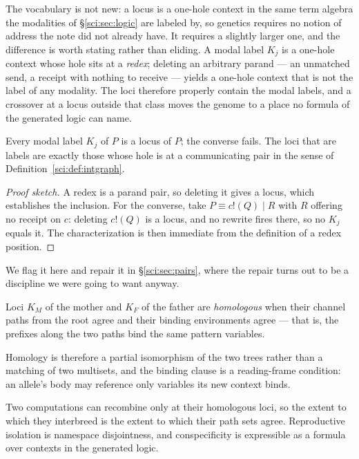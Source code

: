 The vocabulary is not new: a locus is a one-hole context in the same term algebra the modalities of
\S\ref{sci:sec:logic} are labeled by, so genetics requires no notion of address the note did not
already have. It requires a slightly larger one, and the difference is worth stating rather than
eliding. A modal label $K_j$ is a one-hole context whose hole sits at a \emph{redex}; deleting an
arbitrary parand --- an unmatched send, a receipt with nothing to receive --- yields a one-hole
context that is not the label of any modality. The loci therefore properly contain the modal
labels, and a crossover at a locus outside that class moves the genome to a place no formula of the
generated logic can name.

\begin{proposition}
\label{sci:prop:locivlabels}
Every modal label $K_j$ of $P$ is a locus of $P$; the converse fails. The loci that are labels are
exactly those whose hole is at a communicating pair in the sense of
Definition~\ref{sci:def:intgraph}.
\end{proposition}
\begin{proof}[Proof sketch]
A redex is a parand pair, so deleting it gives a locus, which establishes the inclusion. For the
converse, take $P \equiv c!(Q) \mid R$ with $R$ offering no receipt on $c$: deleting $c!(Q)$ is a
locus, and no rewrite fires there, so no $K_j$ equals it. The characterization is then immediate
from the definition of a redex position.
\end{proof}

We flag it here and repair it in \S\ref{sci:sec:pairs}, where the repair turns out to be a discipline
we were going to want anyway.

\begin{definition}[Homology]
\label{sci:def:homology}
Loci $K_M$ of the mother and $K_F$ of the father are \emph{homologous} when their channel paths from
the root agree and their binding environments agree --- that is, the prefixes along the two paths bind
the same pattern variables.
\end{definition}

Homology is therefore a partial isomorphism of the two trees rather than a matching of two multisets,
and the binding clause is a reading-frame condition: an allele's body may reference only variables its
new context binds.

\begin{proposition}
\label{sci:prop:species}
Two computations can recombine only at their homologous loci, so the extent to which they interbreed
is the extent to which their path sets agree. Reproductive isolation is namespace disjointness, and
conspecificity is expressible as a formula over contexts in the generated logic.
\end{proposition}

